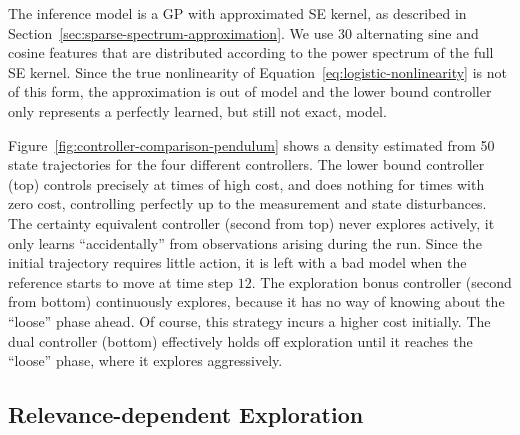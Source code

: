 The inference model is a GP with approximated SE kernel, as described in
Section~\ref{sec:sparse-spectrum-approximation}. We use $30$ alternating
sine and cosine features that are distributed according to the power spectrum
of the full SE kernel. Since the true nonlinearity of
Equation~\eqref{eq:logistic-nonlinearity} is not of this form, the
approximation is out of model and the lower bound controller only represents a
perfectly learned, but still not exact, model.

Figure~\ref{fig:controller-comparison-pendulum} shows a density estimated from
50 state trajectories for the four different controllers. The lower bound
controller (top) controls precisely at times of high cost, and does nothing for
times with zero cost, controlling perfectly up to the measurement and state
disturbances. The certainty equivalent controller (second from top) never
explores actively, it only learns ``accidentally'' from observations arising
during the run. Since the initial trajectory requires little action, it is left
with a bad model when the reference starts to move at time step $12$. The
exploration bonus controller (second from bottom) continuously explores,
because it has no way of knowing about the ``loose'' phase ahead. Of course,
this strategy incurs a higher cost initially. The dual controller (bottom)
effectively holds off exploration until it reaches the ``loose'' phase, where
it explores aggressively.

\begin{figure*}[ht]
  \setlength\figureheight{8cm}
  \setlength{}
  \footnotesize
  \caption[Controller comparison for time-dependent exploration.]{Controller
comparison for time-dependent exploration. {\bfseries Top four:} Density
estimate for 50 trajectories (second state). From top to bottom: lower bound
(\ref*{p:rel-lb}), certainty equivalent control (\ref*{p:rel-ce}), CE with
Bayesian exploration bonus (\ref*{p:rel-eb}), approximate dual control
(\ref*{p:rel-dc}). Reference trajectory (\ref*{p:rel-ref}). {\bfseries Bottom:}
The mean cost per time step is shown in the bottom plot, with colors matching
the controllers noted above.}\label{fig:controller-comparison-pendulum}
\end{figure*}

\subsection{Relevance-dependent Exploration}
\label{sec:exp-information-importance}

